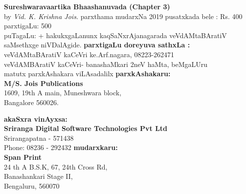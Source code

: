 \thispagestyle{empty}
\begin{flushleft}
{\rm{\textbf{Sureshwaravaartika Bhaashanuvada (Chapter 3)}\\by \textit{Vid. K. Krishna Jois.}}}
\vfill
parxthama mudarxNa {\rm {2019}}
\vfill
pusatxkada bele : {\rm {Rs. 400}}\\
parxtigaLu: {\rm {500}}\\
puTagaLu: {\rm\pageref{prelims:end}+\pageref{book:end}}
\vfill
hakukxgaLanunx kaqSaNxrAjanagarada veVdAMtaBAratiV saMsethxge niVDalAgide. 
\vfill
\textbf{parxtigaLu doreyuva sathxLa :}\\
veVdAMtaBAratiV kaCeVri ke.Arf.nagara, {\rm 08223-262471}\\
veVdAMBAratiV kaCeVri- banashaMkari 2neV haMta, beMgaLUru\\
matutx parxkAshakara viLAsadalilx
\vfill
\textbf{parxkAshakaru:}\\
{\rm {\textbf{M/S. Jois Publications} \\
1609, 19th A main, Muneshwara block,\\
Bangalore 560026.}}

\vfill
\textbf{akaSxra vinAyxsa:}\\ {\rm{\textbf{Sriranga Digital Software Technologies Pvt Ltd}\\ Srirangapatna - 571438\\ Phone: 08236 - 292432}}
\vfill
\textbf{mudarxkaru:}\\ {\rm{\textbf{Span Print}\\ 24 th A B.S.K, 67, 24th Cross Rd,\\ Banashankari Stage II,\\ Bengaluru, 560070}}

\end{flushleft}
